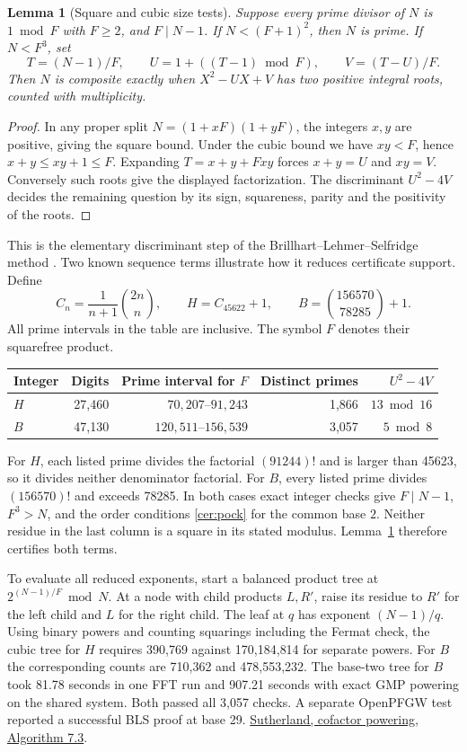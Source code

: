 \documentclass[11pt,a4paper,oneside,openany]{report}
\newtheorem{lemma}[theorem]{Lemma}
\begin{document}
\begin{lemma}[Square and cubic size tests]\label{cer:bls}
Suppose every prime divisor of $N$ is $1\bmod F$ with $F\ge2$, and $F\mid N-1$. If $N<(F+1)^2$, then $N$ is prime. If $N<F^3$, set
\[
 T=(N-1)/F,\qquad U=1+((T-1)\bmod F),\qquad V=(T-U)/F .
\]
Then $N$ is composite exactly when $X^2-UX+V$ has two positive integral roots, counted with multiplicity.
\end{lemma}
\begin{proof}
In any proper split $N=(1+xF)(1+yF)$, the integers $x,y$ are positive, giving the square bound. Under the cubic bound we have $xy<F$, hence $x+y\le xy+1\le F$. Expanding $T=x+y+Fxy$ forces $x+y=U$ and $xy=V$. Conversely such roots give the displayed factorization. The discriminant $U^2-4V$ decides the remaining question by its sign, squareness, parity and the positivity of the roots.
\end{proof}
This is the elementary discriminant step of the Brillhart--Lehmer--Selfridge method \cite{bls}. Two known sequence terms illustrate how it reduces certificate support. Define
\[
 C_n=\frac{1}{n+1}\binom{2n}{n},\qquad H=C_{45622}+1,
 \qquad B=\binom{156570}{78285}+1 .
\]
All prime intervals in the table are inclusive. The symbol $F$ denotes their squarefree product.
\begin{center}\small
\begin{tabular}{@{}lrrrr@{}}\toprule
Integer & Digits & Prime interval for $F$ & Distinct primes & $U^2-4V$\\\midrule
$H$ & 27,460 & $70,207$--$91,243$ &1,866& $13\bmod16$\\
$B$ & 47,130 & $120,511$--$156,539$ &3,057& $5\bmod8$\\\bottomrule
\end{tabular}
\end{center}
For $H$, each listed prime divides the factorial $(91244)!$ and is larger than 45623, so it divides neither denominator factorial. For $B$, every listed prime divides $(156570)!$ and exceeds 78285. In both cases exact integer checks give $F\mid N-1$, $F^3>N$, and the order conditions \eqref{cer:pock} for the common base $2$. Neither residue in the last column is a square in its stated modulus. Lemma~\ref{cer:bls} therefore certifies both terms.

To evaluate all reduced exponents, start a balanced product tree at $2^{(N-1)/F}\bmod N$. At a node with child products $L,R'$, raise its residue to $R'$ for the left child and $L$ for the right child. The leaf at $q$ has exponent $(N-1)/q$. Using binary powers and counting squarings including the Fermat check, the cubic tree for $H$ requires 390,769 against 170,184,814 for separate powers. For $B$ the corresponding counts are 710,362 and 478,553,232. The base-two tree for $B$ took 81.78 seconds in one FFT run and 907.21 seconds with exact GMP powering on the shared system. Both passed all 3,057 checks. A separate OpenPFGW test reported a successful BLS proof at base 29. \href{https://math.mit.edu/~drew/sutherland-phd.pdf}{Sutherland, cofactor powering, Algorithm 7.3}.
\end{document}
